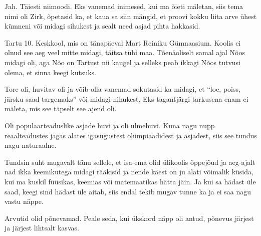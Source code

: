 
Jah. Täiesti niimoodi. Eks vanemad inimesed, kui ma õieti mäletan, siis tema nimi oli Zirk, õpetasid ka, et kaua sa siin mängid, et proovi kokku liita arve ühest kümneni või midagi sihukest ja sealt need asjad  pihta hakkasid.


Tartu 10. Keskkool, mis on tänapäeval  Mart Reiniku Gümnaasium. Koolis ei olnud see aeg veel mitte midagi,  täitsa tühi maa. Tõenäoliselt samal ajal Nõos midagi oli, aga Nõo on Tartust nii kaugel ja selleks peab ikkagi Nõos tutvusi olema, et sinna keegi kutsuks.


Tore oli, huvitav oli ja võib-olla vanemad sokutasid ka midagi, et \enquote{loe, poiss, järsku saad targemaks} või midagi nihukest. Eks  tagantjärgi tarkusena enam ei mäleta, mis see täpselt see ajend oli.


Oli populaarteaduslike asjade huvi ja oli ulmehuvi. Kuna nagu nupp reaalteadustes jagas alates igasugustest  olümpiaadidest ja asjadest, siis see tundus nagu naturaalne. 


Tundsin suht mugavalt tänu sellele, et isa-ema olid ülikoolis õppejõud ja aeg-ajalt nad ikka keemikutega midagi  rääkisid ja nende käest on ju alati võimalik küsida, kui ma kuskil füüsikas, keemias või matemaatikas hätta jäin. Ja kui sa hädast üle saad, keegi sind hädast üle aitab, siis  endal tekib mugav tunne ka ja ei saa nagu vastu näppe.


Arvutid olid põnevamad. Peale seda, kui ükskord näpp oli antud, põnevus järjest ja järjest lihtsalt kasvas.

